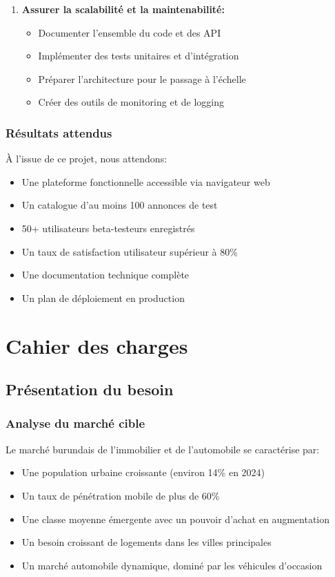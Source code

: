 \documentclass[12pt,a4paper]{report}
\begin{document}
\begin{enumerate}
    \item \textbf{Assurer la scalabilité et la maintenabilité:}
    \begin{itemize}
        \item Documenter l'ensemble du code et des API
        \item Implémenter des tests unitaires et d'intégration
        \item Préparer l'architecture pour le passage à l'échelle
        \item Créer des outils de monitoring et de logging
    \end{itemize}
\end{enumerate}

\subsection{Résultats attendus}

À l'issue de ce projet, nous attendons:
\begin{itemize}
    \item Une plateforme fonctionnelle accessible via navigateur web
    \item Un catalogue d'au moins 100 annonces de test
    \item 50+ utilisateurs beta-testeurs enregistrés
    \item Un taux de satisfaction utilisateur supérieur à 80\%
    \item Une documentation technique complète
    \item Un plan de déploiement en production
\end{itemize}

\chapter{Cahier des charges}

\section{Présentation du besoin}

\subsection{Analyse du marché cible}

Le marché burundais de l'immobilier et de l'automobile se caractérise par:
\begin{itemize}
    \item Une population urbaine croissante (environ 14\% en 2024)
    \item Un taux de pénétration mobile de plus de 60\%
    \item Une classe moyenne émergente avec un pouvoir d'achat en augmentation
    \item Un besoin croissant de logements dans les villes principales
    \item Un marché automobile dynamique, dominé par les véhicules d'occasion
\end{itemize}
\end{document}
